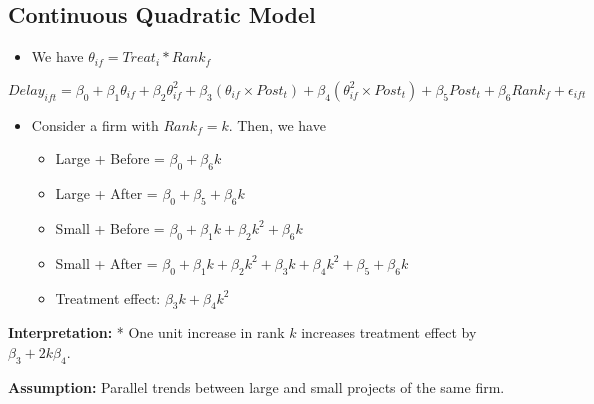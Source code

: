 \documentclass[
]{article}
\providecommand{\tightlist}{%
  \setlength{\itemsep}{0pt}\setlength{\parskip}{0pt}}
\begin{document}
\hypertarget{continuous-quadratic-model}{%
\subsection{Continuous Quadratic
Model}\label{continuous-quadratic-model}}

\begin{itemize}
\tightlist
\item
  We have \(\theta_{if} = Treat_i * Rank_f\)
\end{itemize}

\[ Delay_{ift} = \beta_0 + \beta_1 \theta_{if} + \beta_2 \theta_{if}^2 + \beta_3 (\theta_{if} \times Post_t) + \beta_4 (\theta_{if}^2 \times Post_t)+ \beta_5 Post_t + \beta_6 Rank_f + \epsilon_{ift} \]

\begin{itemize}
\tightlist
\item
  Consider a firm with \(Rank_f = k\). Then, we have

  \begin{itemize}
  \tightlist
  \item
    Large + Before = \(\beta_0 + \beta_6 k\)
  \item
    Large + After = \(\beta_0+\beta_5 +\beta_6 k\)
  \item
    Small + Before = \(\beta_0+\beta_1 k + \beta_2 k^2 + \beta_6 k\)
  \item
    Small + After =
    \(\beta_0+\beta_1 k + \beta_2 k^2 + \beta_3 k + \beta_4 k^2 + \beta_5 + \beta_6 k\)
  \item
    Treatment effect: \(\beta_3 k + \beta_4 k^2\)
  \end{itemize}
\end{itemize}

\textbf{Interpretation:} * One unit increase in rank \(k\) increases
treatment effect by \(\beta_3 + 2k \beta_4\).

\textbf{Assumption:} Parallel trends between large and small projects of
the same firm.
\end{document}

